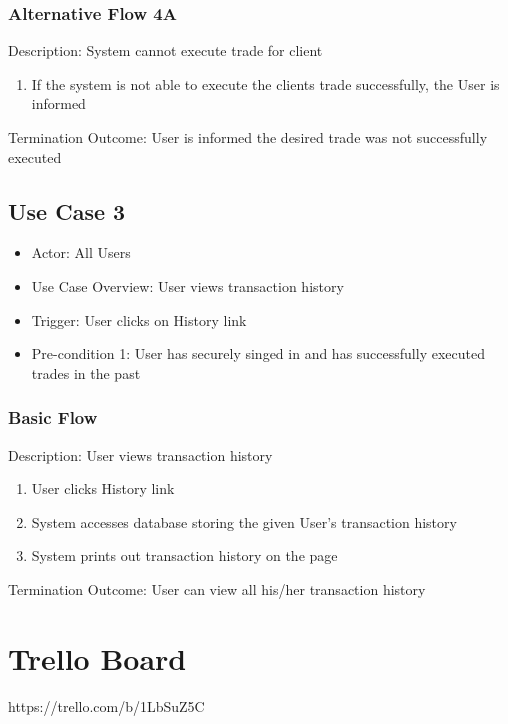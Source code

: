 \documentclass{article}
\begin{document}
\subsubsection{Alternative Flow 4A}
Description: System cannot execute trade for client
\begin{enumerate}
\item If the system is not able to execute the clients trade successfully, the User is informed
\end{enumerate}
Termination Outcome: User is informed the desired trade was not successfully executed

\subsection{Use Case 3}
\begin{itemize}
\item Actor: All Users
\item Use Case Overview:  User views transaction history
\item Trigger: User clicks on History link
\item Pre-condition 1: User has securely singed in and has successfully executed trades in the past
\end{itemize}

\subsubsection{Basic Flow}
Description: User views transaction history
\begin{enumerate}
\item User clicks History link
\item System accesses database storing the given User's transaction history
\item System prints out transaction history on the page 
\end{enumerate}
Termination Outcome: User can view all his/her transaction history

\section{Trello Board}
https://trello.com/b/1LbSuZ5C



\end{document}
